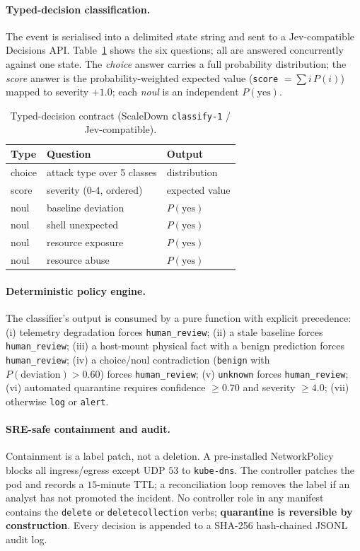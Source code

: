 \documentclass[conference]{IEEEtran}
\begin{document}
\paragraph{Typed-decision classification.} The event is serialised into a delimited state string and sent to a Jev-compatible Decisions API. Table~\ref{tab:contract} shows the six questions; all are answered concurrently against one state. The \emph{choice} answer carries a full probability distribution; the \emph{score} answer is the probability-weighted expected value (\texttt{score} $=\sum i\,P(i)$) mapped to severity $+1.0$; each \emph{noul} is an independent $P(\text{yes})$.

\begin{table}[t]
\caption{Typed-decision contract (ScaleDown \texttt{classify-1} / Jev-compatible).}
\label{tab:contract}
\centering\small
\begin{tabular}{@{}lll@{}}
\toprule
Type & Question & Output \\
\midrule
choice & attack type over 5 classes & distribution \\
score  & severity (0-4, ordered) & expected value \\
noul  & baseline deviation      & $P(\text{yes})$ \\
noul  & shell unexpected        & $P(\text{yes})$ \\
noul  & resource exposure       & $P(\text{yes})$ \\
noul  & resource abuse          & $P(\text{yes})$ \\
\bottomrule
\end{tabular}
\end{table}

\paragraph{Deterministic policy engine.} The classifier's output is consumed by a pure function with explicit precedence: (i) telemetry degradation forces \texttt{human\_review}; (ii) a stale baseline forces \texttt{human\_review}; (iii) a host-mount physical fact with a benign prediction forces \texttt{human\_review}; (iv) a choice/noul contradiction (\texttt{benign} with $P(\text{deviation}) > 0.60$) forces \texttt{human\_review}; (v) \texttt{unknown} forces \texttt{human\_review}; (vi) automated quarantine requires confidence $\ge 0.70$ and severity $\ge 4.0$; (vii) otherwise \texttt{log} or \texttt{alert}.

\paragraph{SRE-safe containment and audit.} Containment is a label patch, not a deletion. A pre-installed NetworkPolicy blocks all ingress/egress except UDP $53$ to \texttt{kube-dns}. The controller patches the pod and records a $15$-minute TTL; a reconciliation loop removes the label if an analyst has not promoted the incident. No controller role in any manifest contains the \texttt{delete} or \texttt{deletecollection} verbs; \textbf{quarantine is reversible by construction}. Every decision is appended to a SHA-256 hash-chained JSONL audit log.
\end{document}

